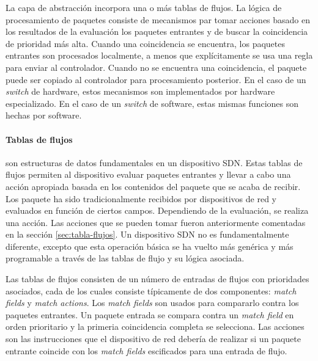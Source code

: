 \documentclass[10pt,journal,compsoc]{IEEEtran}
\begin{document}
La capa de abstracción incorpora una o más tablas de flujos. La lógica de procesamiento de paquetes consiste de mecanismos par tomar acciones basado en los resultados de la evaluación los paquetes entrantes y de buscar la coincidencia de prioridad más alta. Cuando una coincidencia se encuentra, los paquetes entrantes son procesados localmente, a menos que explícitamente se usa una regla para enviar al controlador. Cuando no se encuentra una coincidencia, el paquete puede ser copiado al controlador para procesamiento posterior. En el caso de un \emph{switch} de hardware, estos mecanismos son implementados por hardware especializado. En el caso de un \emph{switch} de software, estas mismas funciones son hechas por software.

\paragraph{Tablas de flujos} son estructuras de datos fundamentales en un dispositivo SDN. Estas tablas de flujos permiten al dispositivo evaluar paquetes entrantes y llevar a cabo una acción apropiada basada en los contenidos del paquete que se acaba de recibir. Los paquete ha sido tradicionalmente recibidos por dispositivos de red y evaluados en función de ciertos campos. Dependiendo de la evaluación, se realiza una acción. Las acciones que se pueden tomar fueron anteriormente comentadas en la sección \ref{sec:tabla-flujos}. Un dispositivo SDN no es fundamentalmente diferente, excepto que esta operación básica se ha vuelto más genérica y más programable a través de las tablas de flujo y su lógica asociada.

Las tablas de flujos consisten de un número de entradas de flujos con prioridades asociados, cada de los cuales consiste típicamente de dos componentes: \emph{match fields} y \emph{match actions}. Los \emph{match fields} son usados para compararlo contra los paquetes entrantes. Un paquete entrada se compara contra un \emph{match field} en orden prioritario y la primeria coincidencia completa se selecciona. Las acciones son las instrucciones que el dispositivo de red debería de realizar si un paquete entrante coincide con los \emph{match fields} escificados para una entrada de flujo.
\end{document}
